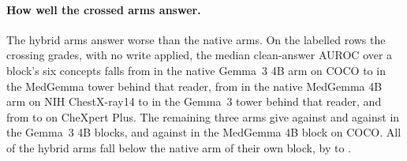 \paragraph{How well the crossed arms answer.} The hybrid arms answer worse than the native arms. On the labelled rows the crossing grades, with no write applied, the median clean-answer AUROC over a block's six concepts falls from \cfSwapAnsNativeGemCoco{} in the native Gemma~3 4B arm on COCO to \cfSwapAnsHybridGemCoco{} in the MedGemma tower behind that reader, from \cfSwapAnsNativeMedNih{} in the native MedGemma 4B arm on NIH ChestX-ray14 to \cfSwapAnsHybridMedNih{} in the Gemma~3 tower behind that reader, and from \cfSwapAnsNativeMedChex{} to \cfSwapAnsHybridMedChex{} on CheXpert Plus. The remaining three arms give \cfSwapAnsNativeGemNih{} against \cfSwapAnsHybridGemNih{} and \cfSwapAnsNativeGemChex{} against \cfSwapAnsHybridGemChex{} in the Gemma~3 4B blocks, and \cfSwapAnsNativeMedCoco{} against \cfSwapAnsHybridMedCoco{} in the MedGemma 4B block on COCO. All \cfSwapAnsWorse{} of the \cfSwapAnsArms{} hybrid arms fall below the native arm of their own block, by \cfSwapAnsDropMin{} to \cfSwapAnsDropMax{}.



